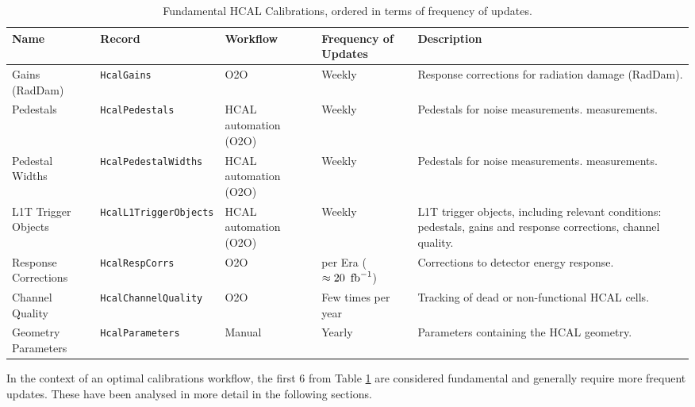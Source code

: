 \begin{table}[h!]
    \centering
    \begin{adjustbox}{max width=\textwidth}
    \begin{tabular}{p{3.5cm}|p{4cm}|p{2.5cm}|p{2cm}|p{4.5cm}}
        \textbf{Name} & \textbf{Record} & \textbf{Workflow} & \textbf{Frequency of Updates} & \textbf{Description} \\ \hline
        Gains (RadDam) & \texttt{HcalGains} & O2O & Weekly & Response corrections for radiation damage (RadDam). \\
         Pedestals & \texttt{HcalPedestals} & HCAL automation (O2O) & Weekly & Pedestals for noise measurements.
measurements.\\
        Pedestal Widths & \texttt{HcalPedestalWidths} & HCAL automation (O2O) & Weekly & Pedestals for noise measurements.
measurements. \\
        L1T Trigger Objects & \texttt{HcalL1TriggerObjects} & HCAL automation (O2O) & Weekly & L1T trigger objects, including relevant conditions: pedestals, gains and response corrections, channel quality. \\
        Response Corrections & \texttt{HcalRespCorrs} & O2O & per Era ($\approx 20~\mbox{\ensuremath{\,\text{fb}^{-1}}}$) & Corrections to detector energy response. \\
        Channel Quality & \texttt{HcalChannelQuality} & O2O & Few times per year & Tracking of dead or non-functional HCAL cells. \\
        Geometry Parameters & \texttt{HcalParameters} & Manual & Yearly & Parameters containing the HCAL geometry. \\
    \end{tabular}
    \end{adjustbox}
    \caption{Fundamental HCAL Calibrations, ordered in terms of frequency of updates.}
    \label{tab:HCALCalibrations_critical}
\end{table}

In the context of an optimal calibrations workflow, the first 6 from Table \ref{tab:HCALCalibrations_critical} are considered fundamental and generally require more frequent updates. These have been analysed in more detail in the following sections. %

